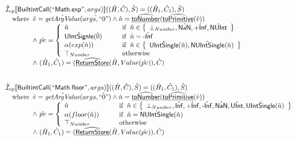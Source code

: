 \[
\begin{array}{l}
\aI _{cp}\lbr \SF{BuiltintCall}(``\SF{Math.exp}",args)\rbr((\hat{H},\hat{C}), \hat{S})
  = ((\hat{H}_1, \hat{C}_1), \hat{S})\\
\quad\wherec{
  \hat{v}=\hat{\hf{getArgValue}}(\hat{args, ``0"}) \land \hat{n}=\ahf{toNumber}(\ahf{toPrimitive}(\hat{v}))\\
  \land\ \hat{pv}   = 
  \left\{
    \begin{array}{l@{\quad\quad\quad}l}
      \hat{n} & \ifc{\hat{n} \in \set{\bot_{Number}, \hat{\SF{NaN}}, \hat{\SF{+Inf}}, \hat{\SF{NUInt}}}}\\
      \hat{\SF{UIntSignle}}(\hat{0}) & \ifc{\hat{n}=\hat{\SF{-Inf}}}\\
      \alpha(exp(\hat{n})) & \ifc{\hat{n} \in \set{\hat{\SF{UIntSingle}}(\hat{n}), \hat{\SF{NUIntSingle}}(\hat{n})}}\\
      \top_{Number} & \owc\\
    \end{array}
  \right.\\
  \land\ (\hat{H}_1, \hat{C}_1) = (\ahf{ReturnStore}(\hat{H}, Value(\hat{pv})), \hat{C})
  }\\
\\\\



\aI _{cp}\lbr \SF{BuiltintCall}(``\SF{Math.floor}",args)\rbr((\hat{H},\hat{C}), \hat{S})
  = ((\hat{H}_1, \hat{C}_1), \hat{S})\\
\quad\wherec{
  \hat{v}=\hat{\hf{getArgValue}}(args, \hat{``0"}) \land \hat{n}=\ahf{toNumber}(\ahf{toPrimitive}(\hat{v}))\\
  \land\ \hat{pv}   = 
  \left\{
    \begin{array}{l@{\quad\quad\quad}l}
      \hat{n} & \ifc{\hat{n} \in \set{\bot_{Number}, \hat{\SF{Inf}}, \hat{\SF{+Inf}}, \hat{\SF{-Inf}}, \hat{\SF{NaN}}, \hat{\SF{UInt}}, \hat{\SF{UIntSingle}}(\hat{n})}}\\
      \alpha(floor(\hat{n})) & \ifc{\hat{n} = \hat{\SF{NUIntSingle}}(\hat{n})}\\
      \top_{Number} & \owc\\
    \end{array}
  \right.\\
  \land\ (\hat{H}_1, \hat{C}_1) = (\ahf{ReturnStore}(\hat{H}, Value(\hat{pv})), \hat{C})
  }\\
\\\\




\end{array}\]
